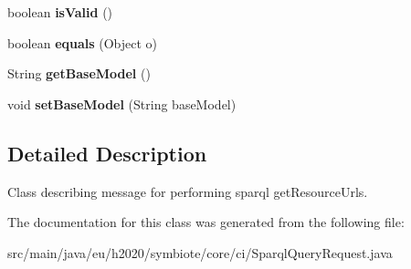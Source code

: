 \begin{DoxyCompactItemize}
\item 
\mbox{\label{classeu_1_1h2020_1_1symbiote_1_1core_1_1ci_1_1SparqlQueryRequest_af387a21f352461287417a019c986c85f}} 
boolean {\bfseries is\+Valid} ()
\item 
\mbox{\label{classeu_1_1h2020_1_1symbiote_1_1core_1_1ci_1_1SparqlQueryRequest_adb8961e597733ada6dd12e9d1fa1d17e}} 
boolean {\bfseries equals} (Object o)
\item 
\mbox{\label{classeu_1_1h2020_1_1symbiote_1_1core_1_1ci_1_1SparqlQueryRequest_ab04a5cb779e371cb1e5deb872feafde1}} 
String {\bfseries get\+Base\+Model} ()
\item 
\mbox{\label{classeu_1_1h2020_1_1symbiote_1_1core_1_1ci_1_1SparqlQueryRequest_a78c729f52f16b037dcd14607804412c3}} 
void {\bfseries set\+Base\+Model} (String base\+Model)
\end{DoxyCompactItemize}


\subsection{Detailed Description}
Class describing message for performing sparql get\+Resource\+Urls. 

The documentation for this class was generated from the following file\+:\begin{DoxyCompactItemize}
\item 
src/main/java/eu/h2020/symbiote/core/ci/Sparql\+Query\+Request.\+java\end{DoxyCompactItemize}
